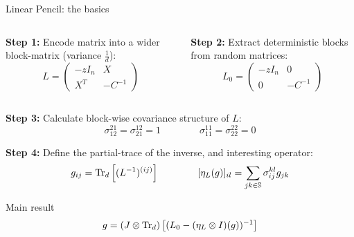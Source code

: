 \documentclass[10pt]{beamer}
\begin{document}
\begin{frame}{Linear Pencil: the basics}
  \begin{columns}[T]
    \begin{column}{0.45\textwidth}
  \textbf{Step 1:} Encode matrix into a wider block-matrix (variance $\frac{1}{d}$):
  \begin{equation*}
    L = \begin{pmatrix}
      -z I_n & X\\
      X^T & -C^{-1}
    \end{pmatrix}
  \end{equation*}
\end{column}
\begin{column}{0.45\textwidth}

  \textbf{Step 2:} Extract deterministic blocks from random matrices:
  \begin{equation*}
    L_0 = \begin{pmatrix}
      -z I_n& 0\\
      0 & -C^{-1}
    \end{pmatrix}
  \end{equation*}
  \end{column}
  \end{columns}
    
  \textbf{Step 3:} Calculate block-wise covariance structure of $L$:
  $$
  \sigma_{12}^{21} = \sigma_{21}^{12} = 1 
  \qquad
  \qquad
  \sigma_{11}^{11} = \sigma_{22}^{22} = 0
  $$


  \textbf{Step 4:} Define the partial-trace of the inverse, and interesting operator:
  \begin{equation*}
    g_{ij} = \traceLim[d]{
      (L^{-1})^{(ij)}
    }
    \qquad \qquad
    [\eta_L(g)]_{il} = \sum_{jk \in \mathbb S} \sigma_{ij}^{kl} g_{jk}
  \end{equation*}

  \begin{block}{Main result \cite{spectra,mingo2017free}}
    \begin{equation}\label{eq:main-result-linear-pencil}
        g = \traceLimOp[d]{
            (L_0 - (\eta_L \otimes I)(g))^{-1}
        }
    \end{equation}
  \end{block}
\end{frame}
\end{document}
